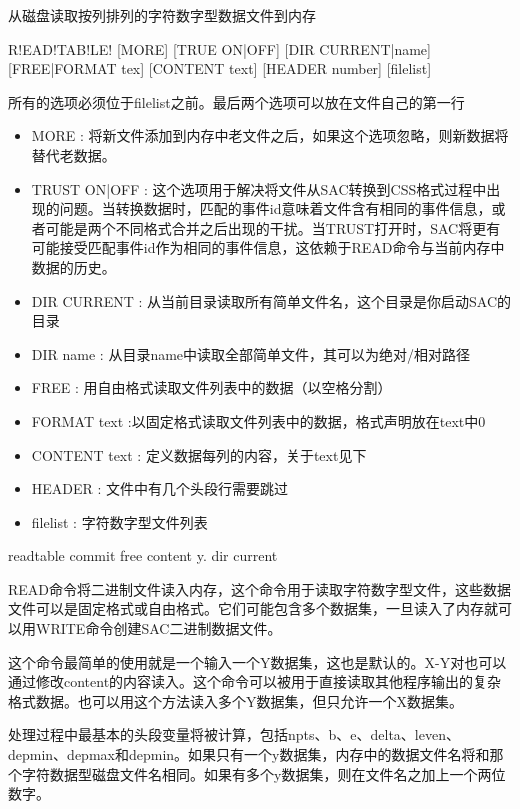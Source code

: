 \label{cmd:readtable}

从磁盘读取按列排列的字符数字型数据文件到内存

\begin{SACSTX}
R!EAD!TAB!LE! [MORE] [TRUE ON|OFF] [DIR CURRENT|name] [FREE|FORMAT tex] 
    [CONTENT text] [HEADER number] [filelist]
\end{SACSTX}
所有的选项必须位于filelist之前。最后两个选项可以放在文件自己的第一行

\begin{itemize}
\item MORE : 将新文件添加到内存中老文件之后，如果这个选项忽略，则新数据将替代老数据。
\item TRUST ON|OFF : 这个选项用于解决将文件从SAC转换到CSS格式过程中出现的问题。当转换数据时，匹配的事件id意味着文件含有相同的事件信息，或者可能是两个不同格式合并之后出现的干扰。当TRUST打开时，SAC将更有可能接受匹配事件id作为相同的事件信息，这依赖于READ命令与当前内存中数据的历史。
\item DIR CURRENT : 从当前目录读取所有简单文件名，这个目录是你启动SAC的目录 
\item DIR name : 从目录name中读取全部简单文件，其可以为绝对/相对路径 
\item FREE : 用自由格式读取文件列表中的数据（以空格分割）
\item FORMAT text :以固定格式读取文件列表中的数据，格式声明放在text中0 
\item CONTENT text : 定义数据每列的内容，关于text见下 
\item HEADER : 文件中有几个头段行需要跳过 
\item filelist : 字符数字型文件列表
\end{itemize}

\begin{SACDFT}
readtable commit free content y. dir current
\end{SACDFT}

READ命令将二进制文件读入内存，这个命令用于读取字符数字型文件，这些数据文件可以是固定格式或自由格式。它们可能包含多个数据集，一旦读入了内存就可以用WRITE命令创建SAC二进制数据文件。

这个命令最简单的使用就是一个输入一个Y数据集，这也是默认的。X-Y对也可以通过修改content的内容读入。这个命令可以被用于直接读取其他程序输出的复杂格式数据。也可以用这个方法读入多个Y数据集，但只允许一个X数据集。

处理过程中最基本的头段变量将被计算，包括npts、b、e、delta、leven、depmin、depmax和depmin。如果只有一个y数据集，内存中的数据文件名将和那个字符数据型磁盘文件名相同。如果有多个y数据集，则在文件名之加上一个两位数字。	

